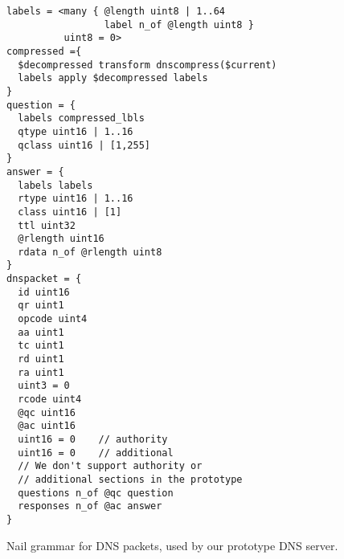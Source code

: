 \begin{figure}
\begin{verbatim}
labels = <many { @length uint8 | 1..64
                 label n_of @length uint8 }
          uint8 = 0>
compressed ={
  $decompressed transform dnscompress($current)
  labels apply $decompressed labels
}
question = {
  labels compressed_lbls
  qtype uint16 | 1..16
  qclass uint16 | [1,255]
}
answer = {
  labels labels
  rtype uint16 | 1..16
  class uint16 | [1]
  ttl uint32
  @rlength uint16
  rdata n_of @rlength uint8
}
dnspacket = {
  id uint16
  qr uint1
  opcode uint4
  aa uint1
  tc uint1
  rd uint1
  ra uint1
  uint3 = 0
  rcode uint4
  @qc uint16
  @ac uint16
  uint16 = 0    // authority
  uint16 = 0    // additional
  // We don't support authority or
  // additional sections in the prototype
  questions n_of @qc question
  responses n_of @ac answer
}
\end{verbatim}
\caption{Nail grammar for DNS packets, used by our prototype DNS server.}
\label{fig:dns-full}
\end{figure}
